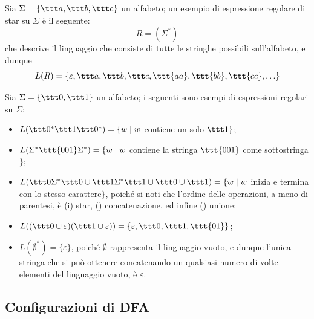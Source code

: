 \documentclass[a4paper, 12pt]{report}
\begin{document}
    \begin{example}[Star]
        Sia $\Sigma = \{\ttt a, \ttt b, \ttt c\}$ un alfabeto; un esempio di espressione regolare di star su $\Sigma$ è il seguente: $$R = (\Sigma^*)$$ che descrive il linguaggio che consiste di tutte le stringhe possibili sull'alfabeto, e dunque $$L(R) = \{\varepsilon, \ttt a, \ttt b, \ttt c, \ttt{aa}, \ttt{bb}, \ttt{cc}, \ldots\}$$
    \end{example}

    \begin{example}
        Sia $\Sigma = \{\ttt 0, \ttt 1\}$ un alfabeto; i seguenti sono esempi di espressioni regolari su $\Sigma$:
        
        \begin{itemize}
            \item $L(\ttt 0 ^* \ttt 1 \ttt 0 ^*) = \{w \mid w$ contiene un solo $\ttt 1 \}$;
            \item $L(\Sigma ^* \ttt{001} \Sigma ^*) = \{ w \mid w$ contiene la stringa $\ttt{001}$ come sottostringa$\}$;
            \item $L(\ttt 0 \Sigma ^* \ttt 0 \cup \ttt 1 \Sigma ^* \ttt 1 \cup \ttt 0 \cup \ttt 1) = \{w \mid w$ inizia e termina con lo stesso carattere$\}$, poiché si noti che l'ordine delle operazioni, a meno di parentesi, è (\tit i) star, () concatenazione, ed infine () unione;
            \item $L((\ttt 0 \cup \varepsilon) (\ttt 1 \cup \varepsilon)) = \{\varepsilon, \ttt 0, \ttt 1, \ttt{01}\}$;
            \item $L(\emptyset ^*) = \{ \varepsilon \}$, poiché $\emptyset$ rappresenta il linguaggio vuoto, e dunque l'unica stringa che si può ottenere concatenando un qualsiasi numero di volte elementi del linguaggio vuoto, è $\varepsilon$.
        \end{itemize}
    \end{example}

    \subsection{Configurazioni di DFA}
\end{document}
